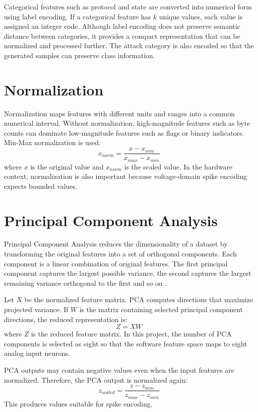 Categorical features such as protocol and state are converted into numerical form using label encoding. If a categorical feature has $k$ unique values, each value is assigned an integer code. Although label encoding does not preserve semantic distance between categories, it provides a compact representation that can be normalized and processed further. The attack category is also encoded so that the generated samples can preserve class information.

\section{Normalization}

Normalization maps features with different units and ranges into a common numerical interval. Without normalization, high-magnitude features such as byte counts can dominate low-magnitude features such as flags or binary indicators. Min-Max normalization is used:
\begin{equation}
x_{norm} = \frac{x - x_{min}}{x_{max} - x_{min}}
\end{equation}
where $x$ is the original value and $x_{norm}$ is the scaled value. In the hardware context, normalization is also important because voltage-domain spike encoding expects bounded values.

\section{Principal Component Analysis}

Principal Component Analysis reduces the dimensionality of a dataset by transforming the original features into a set of orthogonal components. Each component is a linear combination of original features. The first principal component captures the largest possible variance, the second captures the largest remaining variance orthogonal to the first and so on \cite{Jolliffe2016}.

Let $X$ be the normalized feature matrix. PCA computes directions that maximize projected variance. If $W$ is the matrix containing selected principal component directions, the reduced representation is:
\begin{equation}
Z = XW
\end{equation}
where $Z$ is the reduced feature matrix. In this project, the number of PCA components is selected as eight so that the software feature space maps to eight analog input neurons.

PCA outputs may contain negative values even when the input features are normalized. Therefore, the PCA output is normalized again:
\begin{equation}
z_{scaled} = \frac{z - z_{min}}{z_{max} - z_{min}}
\end{equation}
This produces values suitable for spike encoding.

